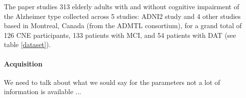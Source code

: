 \documentclass[authoryear,preprint,review]{elsarticle}
\begin{document}
The paper studies 313 elderly adults with and without cognitive impairment of the Alzheimer type collected across 5 studies: ADNI2 study and 4 other studies based in Montreal, Canada (from the ADMTL consortium), for a grand total of 126 CNE participants, 133 patients with MCI, and 54 patients with DAT (see table \ref{dataset}).


\paragraph{Acquisition} %


We need to talk about what we sould say for the parameters not a lot of information is available ...
\end{document}
